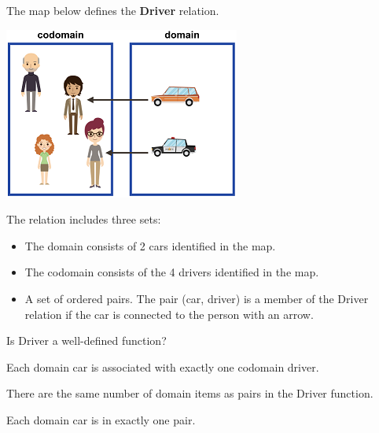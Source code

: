 \documentclass{ximera}
\begin{document}
\begin{definition}
  The map below defines the \textbf{Driver} relation. 
  
  

    \includegraphics[width=293px,height=213px]{pics/r29.png}

  
 

  The  relation includes three sets:
    \begin{itemize}
    \item The domain consists of 2 cars identified in the map.
    \item The codomain consists of the 4 drivers identified in the map.
    \item A set of ordered pairs. The pair (car, driver) is a member of the Driver relation if the car is connected to the person with an arrow.
    \end{itemize}

  
  
\end{definition}













\begin{exercise}
Is Driver a well-defined function?
  \begin{multipleChoice}
  \end{multipleChoice}
  \begin{feedback}
Each domain car is associated with exactly one codomain driver.
  \end{feedback}
\end{exercise}






\begin{exercise}
There are the same number of domain items as pairs in the Driver function.
  \begin{multipleChoice}
  \end{multipleChoice}
  \begin{feedback}
Each domain car is in exactly one pair.
  \end{feedback}
\end{exercise}
\end{document}
